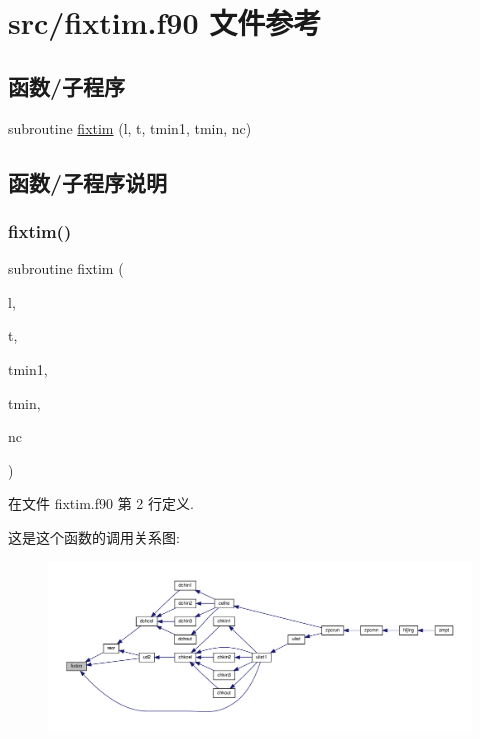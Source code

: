 \hypertarget{fixtim_8f90}{}\section{src/fixtim.f90 文件参考}
\label{fixtim_8f90}
\subsection*{函数/子程序}
\begin{DoxyCompactItemize}
\item 
subroutine \mbox{\hyperlink{fixtim_8f90_a539391d774b1cff01d7cb490bab0799e}{fixtim}} (l, t, tmin1, tmin, nc)
\end{DoxyCompactItemize}


\subsection{函数/子程序说明}
\mbox{\label{fixtim_8f90_a539391d774b1cff01d7cb490bab0799e}} 
\subsubsection{\texorpdfstring{fixtim()}{fixtim()}}
{\footnotesize\ttfamily subroutine fixtim (\begin{DoxyParamCaption}\item[{}]{l,  }\item[{}]{t,  }\item[{}]{tmin1,  }\item[{}]{tmin,  }\item[{}]{nc }\end{DoxyParamCaption})}



在文件 fixtim.\+f90 第 2 行定义.

这是这个函数的调用关系图\+:
\nopagebreak
\begin{figure}[H]
\begin{center}
\leavevmode
\includegraphics[width=350pt]{fixtim_8f90_a539391d774b1cff01d7cb490bab0799e_icgraph}
\end{center}
\end{figure}
